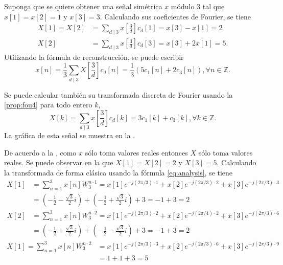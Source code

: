 \begin{example}
Suponga que se quiere obtener una señal simétrica $x$ módulo $3$ tal que $x[1]=x[2]=1$ y $x[3]=3$. Calculando sus coeficientes de Fourier, se tiene
\begin{align*}
    X[1] = X[2] & = \sum_{d \mid 3} x \left[ \frac{3}{d} \right] c_d[1] = x[3] - x[1] = 2 \\
    X[2] & = \sum_{d \mid 3} x \left[ \frac{3}{d} \right] c_d[3] = x[3] + 2 x[1] = 5.
\end{align*}
Utilizando la fórmula de reconstrucción, se puede escribir
\begin{equation*}
x[n] = \frac{1}{3} \sum_{d \mid 3} X \left[ \frac{3}{d} \right] c_d[n] = \frac{1}{3} \left( 5 c_1[n] + 2 c_3[n] \right), \forall n \in \mathbb{Z}.
\end{equation*}

Se puede calcular también su transformada discreta de Fourier usando la \cref{prop:fou4} para todo entero $k$,
\begin{equation*}
    X[k] = \sum_{d \mid 3} x \left[ \frac{3}{d} \right] c_d[k] = 3 c_1[k] + c_3[k], \forall k \in \mathbb{Z}.
\end{equation*}
La gráfica de esta señal se muestra en la .
\end{example}

De acuerdo a la , como $x$ sólo toma valores reales entonces $X$ sólo toma valores reales. Se puede observar en la  que $X[1] = X[2] = 2$ y $X[3] = 5$. Calculando la transformada de forma clásica usando la fórmula \eqref{eq:analysis}, se tiene
\begin{align*}
    X[1] & = \sum_{n=1}^{3} x[n] W_3^{n \cdot 1} = x[1] e^{-j(2 \pi / 3) \cdot 1} + x[2] e^{-j(2 \pi / 3) \cdot 2} + x[3] e^{-j(2 \pi / 3) \cdot 3} \\
         & = \left( -\frac{1}{2} - \frac{\sqrt{3}}{2} i \right) + \left(  -\frac{1}{2} + \frac{\sqrt{3}}{2} i \right) + 3 = -1 + 3 = 2
\end{align*}
\begin{align*}
    X[2] & = \sum_{n=1}^{3} x[n] W_3^{n \cdot 2} = x[1] e^{-j(2 \pi / 3) \cdot 2} + x[2] e^{-j(2 \pi / 4) \cdot 2} + x[3] e^{-j(2 \pi / 3) \cdot 6} \\
         & = \left( -\frac{1}{2} + \frac{\sqrt{3}}{2} i \right) + \left(  -\frac{1}{2} - \frac{\sqrt{3}}{2} i \right) + 3 = -1 + 3 = 2
\end{align*}
\begin{align*}
    X[1] = \sum_{n=1}^{3} x[n] W_3^{n \cdot 2} & = x[1] e^{-j(2 \pi / 3) \cdot 3} + x[2] e^{-j(2 \pi / 3) \cdot 6} + x[3] e^{-j(2 \pi / 3) \cdot 9} \\
                                               & = 1 + 1 + 3 = 5
\end{align*}

